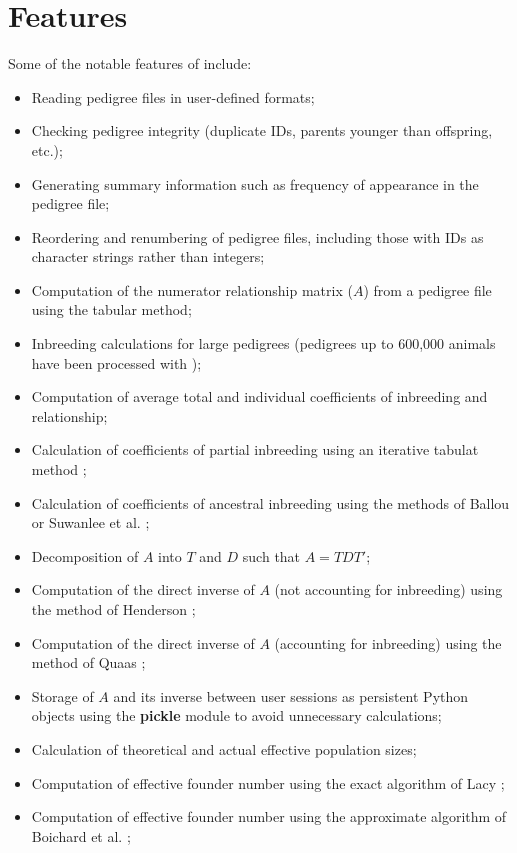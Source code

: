 \section{Features}
Some of the notable features of \PyPedal{} include:
\begin{itemize}
\item Reading pedigree files in user-defined formats;
\item Checking pedigree integrity (duplicate IDs, parents younger than offspring, etc.);
\item Generating summary information such as frequency of appearance in the pedigree file;
\item Reordering and renumbering of pedigree files, including those with IDs as character strings rather than integers;
\item Computation of the numerator relationship matrix ($A$) from a pedigree file using the tabular method;
\item Inbreeding calculations for large pedigrees (pedigrees up to 600,000 animals have been processed with \PyPedal{});
\item Computation of average total and individual coefficients of inbreeding and relationship;
\item Calculation of coefficients of partial inbreeding using an iterative tabulat method \cite{LacyAW1996,GulisijaGWT2006};
\item Calculation of coefficients of ancestral inbreeding using the methods of Ballou \citeyear{Ballou1997} or Suwanlee et al. \citeyear{SuwanleeBSC2007};
\item Decomposition of $A$ into $T$ and $D$ such that $A=TDT'$;
\item Computation of the direct inverse of $A$ (not accounting for inbreeding) using the method of Henderson \citeyear{ref143};
\item Computation of the direct inverse of $A$ (accounting for inbreeding) using the method of Quaas \citeyear{ref235};
\item Storage of $A$ and its inverse between user sessions as persistent Python objects using the \textbf{pickle} module to avoid unnecessary calculations;
\item Calculation of theoretical and actual effective population sizes;
\item Computation of effective founder number using the exact algorithm of Lacy \citeyear{ref640};
\item Computation of effective founder number using the approximate algorithm of Boichard et al. \citeyear{ref352};

\end{itemize}
